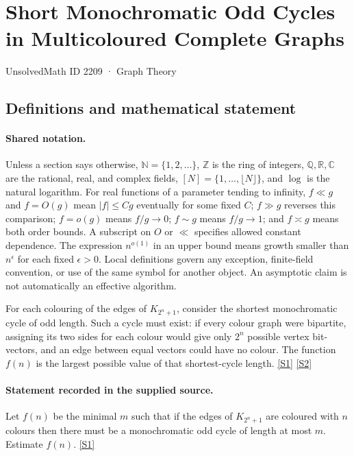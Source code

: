\documentclass[11pt,a4paper]{article}
\newcommand{\N}{\mathbb{N}}
\newcommand{\Z}{\mathbb{Z}}
\newcommand{\Q}{\mathbb{Q}}
\newcommand{\R}{\mathbb{R}}
\newcommand{\C}{\mathbb{C}}
\newcommand{\sref}[2]{\hyperlink{source:#1:#2}{[S#2]}}
\begin{document}

\setcounter{section}{2208}

\section{Short Monochromatic Odd Cycles in Multicoloured Complete Graphs}\label{2209}

{\small\sffamily UnsolvedMath ID 2209 · Graph Theory}

\subsection{Definitions and mathematical statement}

\paragraph{Shared notation.}Unless a section says otherwise, $\N=\{1,2,\ldots\}$,
$\Z$ is the ring of integers, $\Q,\R,\C$ are the rational, real, and complex
fields, $[N]=\{1,\ldots,\lfloor N\rfloor\}$, and $\log$ is the natural
logarithm. For real functions of a parameter tending to infinity,
$f\ll g$ and $f=O(g)$ mean $|f|\leq Cg$ eventually for some fixed $C$;
$f\gg g$ reverses this comparison; $f=o(g)$ means $f/g\to0$;
$f\sim g$ means $f/g\to1$; and $f\asymp g$ means both order bounds.
A subscript on $O$ or $\ll$ specifies allowed constant dependence.
The expression $n^{o(1)}$ in an upper bound means growth smaller than
$n^\epsilon$ for each fixed $\epsilon>0$. Local definitions govern any
exception, finite-field convention, or use of the same symbol for another
object. An asymptotic claim is not automatically an effective algorithm.



For each colouring of the edges of $K_{2^n+1}$, consider the shortest monochromatic cycle of odd length. Such a cycle must exist: if every colour graph were bipartite, assigning its two sides for each colour would give only $2^n$ possible vertex bit-vectors, and an edge between equal vectors could have no colour. The function $f(n)$ is the largest possible value of that shortest-cycle length. \sref{2209}{1} \sref{2209}{2}

\paragraph{Statement recorded in the supplied source.}
Let $f(n)$ be the minimal $m$ such that if the edges of $K_{2^n+1}$ are coloured with $n$ colours then there must be a monochromatic odd cycle of length at most $m$. Estimate $f(n)$. \sref{2209}{1}
\end{document}
